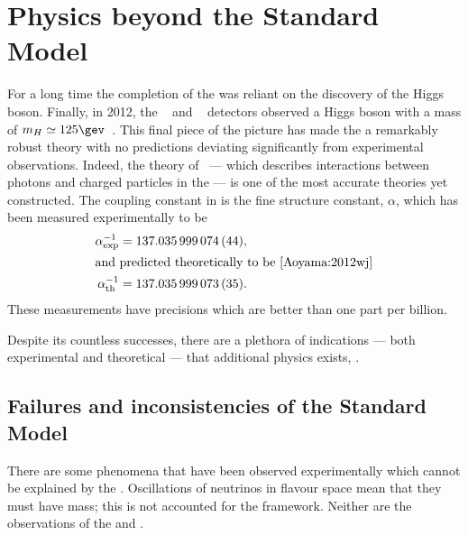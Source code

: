 \section{Physics beyond the Standard Model}
\label{sec:bsm}

For a long time the completion of the \sm was reliant on the discovery of the Higgs boson.
Finally, in 2012, the \cms~\cite{Chatrchyan:2008aa} and \atlas~\cite{Aad:2008zzm} detectors
observed a Higgs boson with a mass of $m_H\simeq125\gev$~\cite{Chatrchyan:2012ufa,Aad:2012tfa}.
This final piece of the picture has made the \sm a remarkably robust theory with no predictions
deviating significantly from experimental observations.
Indeed, the theory of \QED~--- which describes interactions between
photons and charged particles in the \sm --- is one of the most accurate theories yet constructed.
The coupling constant in \QED is the fine structure constant, $\alpha$, which has been measured
experimentally to be~\cite{PDG2012}
\begin{align}
  \alpha^{-1}_\mathrm{exp} &= 137.035\,999\,074\,(44), \nonumber\\
  \intertext{and predicted theoretically to be~\cite{Aoyama:2012wj}}
  \alpha^{-1}_\mathrm{th} &= 137.035\,999\,073\,(35). \nonumber
\end{align}
These measurements have precisions which are better than one part per billion.

Despite its countless successes, there are a plethora of indications --- both
experimental and theoretical --- that additional physics exists, \bsm.


\subsection{Failures and inconsistencies of the Standard Model}
\label{sec:bsm:fail}
There are some phenomena that have been observed experimentally which cannot be explained by the
\sm.
Oscillations of neutrinos in flavour space mean that they must have mass; this is not accounted for
the \sm framework.
Neither are the observations of the \BAU and \dm.

